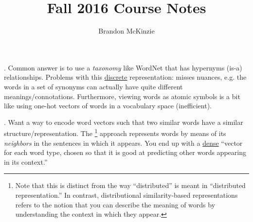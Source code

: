 \documentclass[11pt]{article}
\title{\vspace{-10mm}\fontsize{24pt}{8pt}\selectfont\textbf{Fall 2016 Course Notes}\vspace*{-4mm}}
\author{Brandon McKinzie}
\date{}
\newcommand\myspace[1][]{\vspace{#1\bigskipamount}}
\newcommand\p{\Needspace{10\baselineskip} \noindent}
\begin{document}
\dosecttoc
\tableofcontents

\label{NLP with Deep Learning}



\p {}. Common answer is to use a \textit{taxonomy} like WordNet that has hypernyms (is-a) relationships. Problems with this \underline{discrete} representation: misses nuances, e.g. the words in a set of synonyms can actually have quite different meanings/connotations. Furthermore, viewing words as atomic symbols is a bit like using one-hot vectors of words in a vocabulary space (inefficient).

\myspace
\p {}. Want a way to encode word vectors such that two similar words have a similar structure/representation. The \footnote{Note that this is distinct from the way ``distributed'' is meant in ``distributed representation.'' In contrast, distributional similarity-based representations refers to the notion that you can describe the meaning of words by understanding the context in which they appear.} approach represents words by means of its \textit{neighbors} in the sentences in which it appears. You end up with a \underline{dense} ``vector for each word type, chosen so that it is good at predicting other words appearing in its context.''
\end{document}
